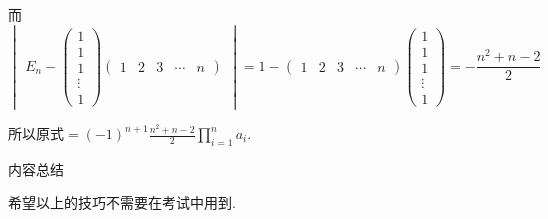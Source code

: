 \begin{solution}
    而 \[ \begin{vmatrix}E_n-\begin{pmatrix}
        1\\1\\1\\\vdots\\1
    \end{pmatrix}\begin{pmatrix}1 & 2 & 3 & \cdots & n\end{pmatrix}\end{vmatrix}
    =1-\begin{pmatrix}1 & 2 & 3 & \cdots & n\end{pmatrix}
        \begin{pmatrix}1 \\ 1 \\ 1 \\ \vdots \\ 1\end{pmatrix}
    =-\frac{n^2+n-2}{2} \]

    所以原式$\displaystyle =(-1)^{n+1}\frac{n^2+n-2}{2}\prod_{i=1}^na_i$.
\end{solution}

\centerline{\heiti \Large 内容总结}

希望以上的技巧不需要在考试中用到.

\vspace{2ex}

